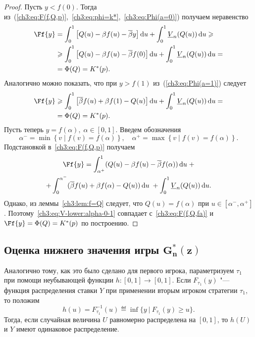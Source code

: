 {\begin{proof}
  Пусть $y < f(0)$.
  Тогда из~(\ref{ch3:eq:F(f,Q,p)},~\ref{ch3:eq:phi=k*},~\ref{ch3:eq:Phi(a=0)}) получаем неравенство
  \begin{align*}
    \Ff{y} 
    &= \int_0^1 \left[ 
      Q(u) - \Co f(u) - \DCo y 
    \right] \di u +
    \int_0^1 \LV{n}(Q(u)) \di u \geq \\
    &\geq \int_0^1 \left[ 
      Q(u) - \Co f(u) - \DCo f(0) 
    \right] \di u + \int_0^1 \LV{n}(Q(u)) \di u = \\
    &= \Phi(Q) = K^*(p).
  \end{align*}
  Аналогично можно показать, что при $y > f(1)$ из~(\ref{ch3:eq:Phi(a=1)}) следует
  \begin{align*}
    \Ff{y} 
    &\geq \int_0^1 \left[ 
      \DCo f(u) + \Co f(1) - Q(u) 
    \right] \di u + \int_0^1 \LV{n}(Q(u)) \di u = \\
    &= \Phi(Q) = K^*(p).
  \end{align*}
  Пусть теперь $y = f(\alpha), \; \alpha \in [0, 1]$. Введем обозначения
  \[
    \alpha^- = \min \left\{ v \;|\; f(v) = f(\alpha) \right\}, \quad \alpha^+ =
    \max \left\{ v \;|\; f(v) = f(\alpha) \right\}.
  \]
  Подстановкой в~\eqref{ch3:eq:F(f,Q,p)} получаем
  \begin{multline}\label{ch3:eq:V-lower:alpha-0-1}
    \Ff{y} =
    \int_{\alpha^+}^1  (Q(u) - \Co f(u) - \DCo f(\alpha)) \di u \; + \\
    + \int_0^{\alpha^-} (\DCo f(u) + \Co f(\alpha) - Q(u)) \di u \; + \int_0^1
    \LV{n}(Q(u)) \di u.
  \end{multline}
  Однако, из леммы~\ref{ch3:lem:f=Q} следует, что $Q(u) = f(\alpha)$ при $u \in [\alpha^-, \alpha^+]$.
  Поэтому~\eqref{ch3:eq:V-lower:alpha-0-1} совпадает с~\eqref{ch3:eq:F(f,Q,fa)} и $\Ff{y} = \Phi(Q) = K^*(p)$ по построению.
\end{proof}

\subsection{Оценка нижнего значения игры $\mathbf{G^*_n(z)}$}
\label{ch3:sec:-dual-game}

Аналогично тому, как это было сделано для первого игрока, параметризуем $\tau_1$ при помощи неубывающей функции $h: [0, 1] \rightarrow [0, 1]$.
Если $F_{\tau_1}(y)$ "--- функция распределения ставки $Y$ при применении вторым игроком стратегии $\tau_1$, то положим
\begin{equation*}
  h(u) = F^{-1}_{\tau_1}(u) \eqdef \inf \{ y\ |\ F_{\tau_1}(y) \geq u \}.
\end{equation*}
Тогда, если случайная величина $U$ равномерно распределена на $[0, 1]$, то $h(U)$ и $Y$ имеют одинаковое распределение.

}
